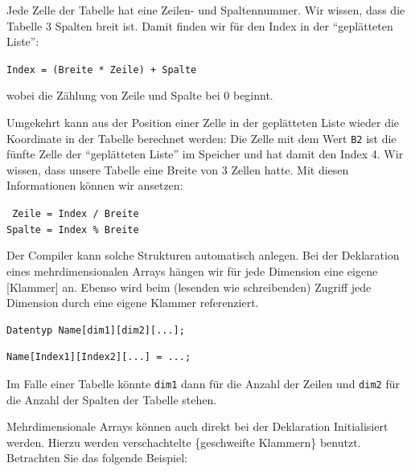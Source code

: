 Jede Zelle der Tabelle hat eine Zeilen- und Spaltennummer. Wir wissen, dass die Tabelle 3 Spalten breit ist. Damit finden wir für den Index in der \enquote{geplätteten Liste}:
\begin{center}
\texttt{Index = (Breite * Zeile) + Spalte}
\end{center}
wobei die Zählung von Zeile und Spalte bei 0 beginnt.

Umgekehrt kann aus der Position einer Zelle in der geplätteten Liste wieder die Koordinate in der Tabelle berechnet werden: Die Zelle mit dem Wert \texttt{B2} ist die fünfte Zelle der \enquote{geplätteten Liste} im Speicher und hat damit den Index 4. Wir wissen, dass unsere Tabelle eine Breite von 3 Zellen hatte. Mit diesen Informationen können wir ansetzen:
\begin{center}
\texttt{ Zeile = Index / Breite}\\
\texttt{Spalte = Index \% Breite}
\end{center}

Der Compiler kann solche Strukturen automatisch anlegen. Bei der Deklaration eines mehrdimensionalen Arrays hängen wir für jede Dimension eine eigene [Klammer] an. Ebenso wird beim (lesenden wie schreibenden) Zugriff jede Dimension durch eine eigene Klammer referenziert.

\begin{codebox}
\begin{verbatim}
Datentyp Name[dim1][dim2][...];
\end{verbatim}
\end{codebox}

\begin{codebox}
\begin{verbatim}
Name[Index1][Index2][...] = ...;
\end{verbatim}
\end{codebox}

Im Falle einer Tabelle könnte \texttt{dim1} dann für die Anzahl der Zeilen und \texttt{dim2} für die Anzahl der Spalten der Tabelle stehen.

Mehrdimensionale Arrays können auch direkt bei der Deklaration Initialisiert werden. Hierzu werden verschachtelte \{geschweifte Klammern\} benutzt. Betrachten Sie das folgende Beispiel:

